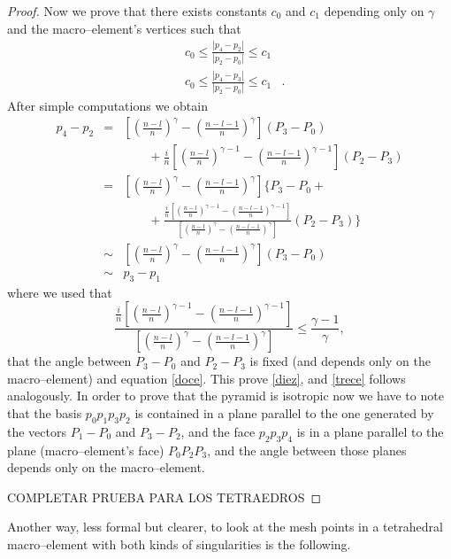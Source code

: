 \begin{proof}
Now we prove that there exists constants $c_0$ and $c_1$ depending only on $\gamma$ and the macro--element's vertices such that
\begin{eqnarray}\label{diez}
&c_0\le\frac{|p_4-p_2|}{|p_2-p_0|}\le c_1&\\ \label{trece}
&c_0\le\frac{|p_4-p_3|}{|p_2-p_0|}\le c_1&.
\end{eqnarray}
After simple computations we obtain
\begin{eqnarray*}
p_4-p_2 &=& \left[\left(\frac{n-l}n\right)^\gamma - \left(\frac{n-l-1}n\right)^\gamma\right](P_3-P_0) \\ &&\qquad + \frac in \left[\left(\frac{n-l}n\right)^{\gamma-1} - \left(\frac{n-l-1}n\right)^{\gamma-1}\right](P_2-P_3)\\ &=& \left[\left(\frac{n-l}n\right)^\gamma - \left(\frac{n-l-1}n\right)^\gamma\right]\bigg\{P_3-P_0 +\\ &&\qquad + \frac{\frac in \left[\left(\frac{n-l}n\right)^{\gamma-1} - \left(\frac{n-l-1}n\right)^{\gamma-1}\right]}{\left[\left(\frac{n-l}n\right)^\gamma - \left(\frac{n-l-1}n\right)^\gamma\right]} (P_2-P_3)\bigg\}\\ &\sim& \left[\left(\frac{n-l}n\right)^\gamma - \left(\frac{n-l-1}n\right)^\gamma\right](P_3-P_0)\\ &\sim& p_3-p_1
\end{eqnarray*}
where we used that 
\[
\frac{\frac in \left[\left(\frac{n-l}n\right)^{\gamma-1} - \left(\frac{n-l-1}n\right)^{\gamma-1}\right]}{\left[\left(\frac{n-l}n\right)^\gamma - \left(\frac{n-l-1}n\right)^\gamma\right]}\le \frac{\gamma-1}{\gamma},
\]
that the angle between $P_3-P_0$ and $P_2-P_3$ is fixed (and depends only on the macro--element) and equation \eqref{doce}. This prove \eqref{diez}, and \eqref{trece} follows analogously. In order to prove that the pyramid is isotropic now we have to note that the basis $p_0p_1p_3p_2$ is contained in a plane parallel to the one generated by the vectors $P_1-P_0$ and $P_3-P_2$, and the face $p_2p_3p_4$ is in a plane parallel to the plane (macro--element's face) $P_0P_2P_3$, and the angle between those planes depends only on the macro--element.      


COMPLETAR PRUEBA PARA LOS TETRAEDROS
\end{proof}



Another way, less formal but clearer, to look
at the  mesh points in a tetrahedral macro--element
with both kinds of singularities is the following.

